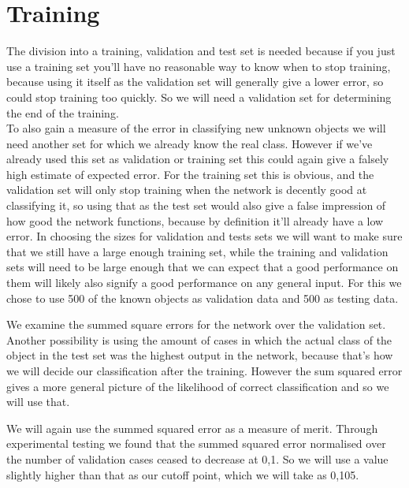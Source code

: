 \section{Training}
\begin{description}[style=unboxed]
    \item[How and why did you divide your data into a training, validation and test set?]
    The division into a training, validation and test set is needed because if you just use a training set you'll have no reasonable way to know when to stop training, because using it itself as the validation set will generally give a lower error, so could stop training too quickly. So we will need a validation set for determining the end of the training.\\
    To also gain a measure of the error in classifying new unknown objects we will need another set for which we already know the real class. However if we've already used this set as validation or training set this could again give a falsely high estimate of expected error. For the training set this is obvious, and the validation set will only stop training when the network is decently good at classifying it, so using that as the test set would also give a false impression of how good the network functions, because by definition it'll already have a low error. In choosing the sizes for validation and tests sets we will want to make sure that we still have a large enough training set, while the training and validation sets will need to be large enough that we can expect that a good performance on them will likely also signify a good performance on any general input. For this we chose to use 500 of the known objects as validation data and 500 as testing data.
    \item[How do you evaluate the performance of your network?]
    We examine the summed square errors for the network over the validation set. Another possibility is using the amount of cases in which the actual class of the object in the test set was the highest output in the network, because that's how we will decide our classification after the training. However the sum squared error gives a more general picture of the likelihood of correct classification and so we will use that.
    \item[When and why do you decide to end the training?]
    We will again use the summed squared error as a measure of merit. Through experimental testing we found that the summed squared error normalised over the number of validation cases ceased to decrease at 0,1. So we will use a value slightly higher than that as our cutoff point, which we will take as 0,105.

\end{description}
